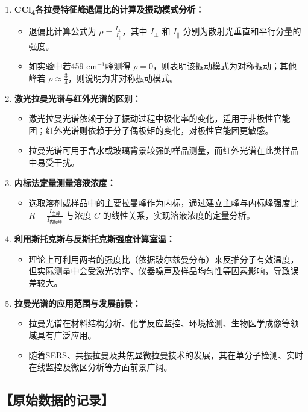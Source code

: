 \documentclass[12pt,a4paper,UTF8]{ctexart}
\begin{document}
\begin{enumerate}
	\item \textbf{CCl\textsubscript{4}各拉曼特征峰退偏比的计算及振动模式分析：}
	\begin{itemize}
	  \item 退偏比计算公式为 $\rho=\frac{I_\perp}{I_\parallel}$，其中 $I_\perp$ 和 $I_\parallel$ 分别为散射光垂直和平行分量的强度。
	  \item 如实验中若459 cm$^{-1}$峰测得 $\rho=0$，则表明该振动模式为对称振动；其他峰若 $\rho\approx\frac{3}{4}$，则说明为非对称振动模式。
	\end{itemize}
  
	\item \textbf{激光拉曼光谱与红外光谱的区别：}
	\begin{itemize}
	  \item 激光拉曼光谱依赖于分子振动过程中极化率的变化，适用于非极性官能团；红外光谱则依赖于分子偶极矩的变化，对极性官能团更敏感。
	  \item 拉曼光谱可用于含水或玻璃背景较强的样品测量，而红外光谱在此类样品中易受干扰。
	\end{itemize}
  
	\item \textbf{内标法定量测量溶液浓度：}
	\begin{itemize}
	  \item 选取溶剂或样品中的主要拉曼峰作为内标，通过建立主峰与内标峰强度比 $R=\frac{I_{\text{主峰}}}{I_{\text{内标峰}}}$ 与浓度 $C$ 的线性关系，实现溶液浓度的定量分析。
	\end{itemize}
  
	\item \textbf{利用斯托克斯与反斯托克斯强度计算室温：}
	\begin{itemize}
	  \item 理论上可利用两者的强度比（依据玻尔兹曼分布）来反推分子有效温度，但实际测量中会受激光功率、仪器噪声及样品均匀性等因素影响，导致误差较大。
	\end{itemize}
  
	\item \textbf{拉曼光谱的应用范围与发展前景：}
	\begin{itemize}
	  \item 拉曼光谱在材料结构分析、化学反应监控、环境检测、生物医学成像等领域具有广泛应用。
	  \item 随着SERS、共振拉曼及共焦显微拉曼技术的发展，其在单分子检测、实时在线监控及微区分析等方面前景广阔。
	\end{itemize}
\end{enumerate}



\subsection*{【原始数据的记录】}

\end{document}
